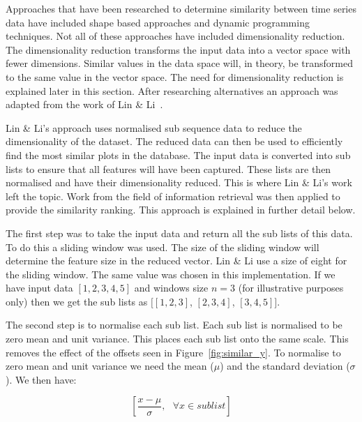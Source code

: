 Approaches that have been researched to determine similarity between time series data have included shape based approaches and dynamic programming techniques.  Not all of these approaches have included dimensionality reduction.  The dimensionality reduction transforms the input data into a vector space with fewer dimensions.  Similar values in the data space will, in theory, be transformed to the same value in the vector space.  The need for dimensionality reduction is explained later in this section.  After researching alternatives an approach was adapted from the work of Lin \& Li~\cite{structural_similarity}.

Lin \& Li's approach uses normalised sub sequence data to reduce the dimensionality of the dataset.  The reduced data can then be used to efficiently find the most similar plots in the database.  The input data is converted into sub lists to ensure that all features will have been captured.  These lists are then normalised and have their dimensionality reduced.  This is where Lin \& Li's work left the topic.  Work from the field of information retrieval was then applied to provide the similarity ranking. This approach is explained in further detail below.

The first step was to take the input data and return all the sub lists of this data.  To do this a sliding window was used.  The size of the sliding window will determine the feature size in the reduced vector.  Lin \& Li use a size of eight for the sliding window.  The same value was chosen in this implementation.  If we have input data $[1,2,3,4,5]$ and windows size $n = 3$ (for illustrative purposes only) then we get the sub lists as $[[1,2,3]$, $[2,3,4]$, $[3,4,5]]$.

The second step is to normalise each sub list.  Each sub list is normalised to be zero mean and unit variance.  This places each sub list onto the same scale.  This removes the effect of the offsets seen in Figure~\ref{fig:similar_y}.  To normalise to zero mean and unit variance we need the mean ($\mu$) and the standard deviation ($\sigma$).  We then have:

$$
\left[\frac{x - \mu}{\sigma},\text{   } \forall x \in sublist\right]
$$

